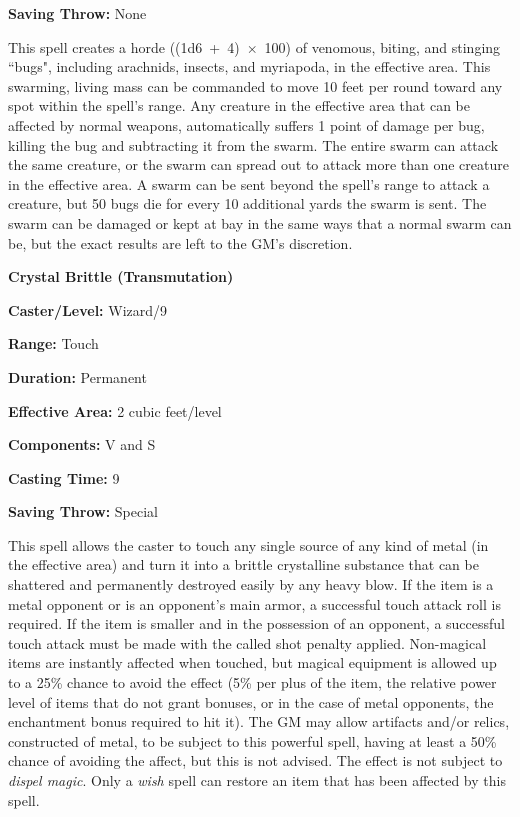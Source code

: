 \begin{multicols}{2}
\begin{minipage}{\columnwidth}
\noindent \textbf{Saving Throw:} None

\end{minipage}

This spell creates a horde ((1d6~+~4)~$\times$~100) of venomous, biting, and stinging ``bugs", including arachnids, insects, and myriapoda, in the effective area.  This swarming, living mass can be commanded to move 10 feet per round toward any spot within the spell's range.  Any creature in the effective area that can be affected by normal weapons, automatically suffers 1 point of damage per bug, killing the bug and subtracting it from the swarm.  The entire swarm can attack the same creature, or the swarm can spread out to attack more than one creature in the effective area.  A swarm can be sent beyond the spell's range to attack a creature, but 50 bugs die for every 10 additional yards the swarm is sent.  The swarm can be damaged or kept at bay in the same ways that a normal swarm can be, but the exact results are left to the GM's discretion.

\vspace{1em}

\noindent
\begin{minipage}{\columnwidth}

\noindent \textbf{Crystal Brittle (Transmutation)}

\noindent \textbf{Caster/Level:} Wizard/9

\noindent \textbf{Range:} Touch

\noindent \textbf{Duration:} Permanent

\noindent \textbf{Effective Area:} 2 cubic feet/level

\noindent \textbf{Components:} V and S

\noindent \textbf{Casting Time:} 9

\noindent \textbf{Saving Throw:} Special

\end{minipage}

This spell allows the caster to touch any single source of any kind of metal (in the effective area) and turn it into a brittle crystalline substance that can be shattered and permanently destroyed easily by any heavy blow.  If the item is a metal opponent or is an opponent's main armor, a successful touch attack roll is required.  If the item is smaller and in the possession of an opponent, a successful touch attack must be made with the called shot penalty applied.  Non-magical items are instantly affected when touched, but magical equipment is allowed up to a 25\% chance to avoid the effect (5\% per plus of the item, the relative power level of items that do not grant bonuses, or in the case of metal opponents, the enchantment bonus required to hit it).  The GM may allow artifacts and/or relics, constructed of metal, to be subject to this powerful spell, having at least a 50\% chance of avoiding the affect, but this is not advised.  The effect is not subject to \textit{dispel magic}.  Only a \textit{wish} spell can restore an item that has been affected by this spell.


\end{multicols}
